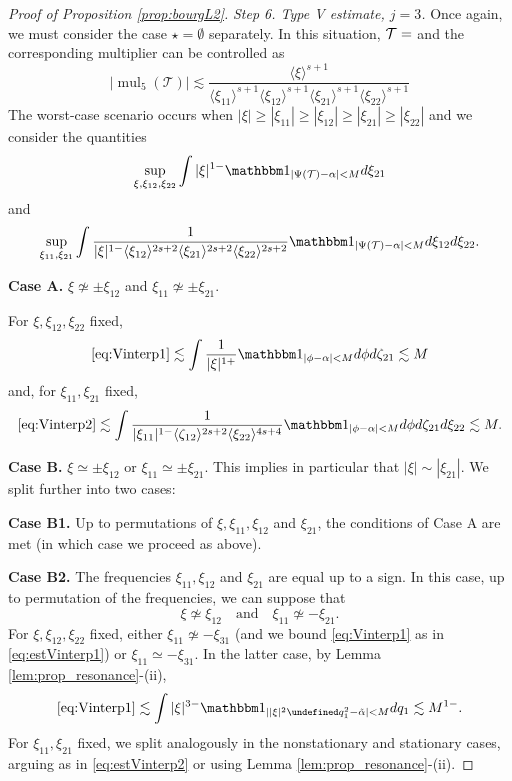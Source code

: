 \documentclass[a4paper,
11pt,  reqno]{amsart}
\makeatletter
\newcommand{\jap}[1]{\langle #1 \rangle}
\newcommand{\5}{\textup{V}}
\newcommand{\noi}{\noindent}
\newcommand{\ind}{\mathbbm 1}
\theoremstyle{remark}
\let\Re=\undefined\DeclareMathOperator*{\Re}{Re}
\newcommand{\TT}{\mathcal{T}}
\DeclareMathOperator{\mul}{mul}
\def\<#1>{\csname MH@symb@#1\endcsname}
\numberwithin{equation}{section}
\numberwithin{theorem}{section}
\makeatother
\begin{document}
\begin{proof}[Proof of Proposition \ref{prop:bourgL2}]
\medskip
\noi\textit{Step 6. Type V estimate, $j=3$.} Once again, we must consider the case $\star=\emptyset$ separately. In this situation, $\TT=\<33>$ and the corresponding multiplier can be controlled as
$$
|\mul_5(\TT)|\lesssim \frac{\jap{\xi}^{s+1}}{\jap{\xi_{11}}^{s+1}\jap{\xi_{12}}^{s+1}\jap{\xi_{21}}^{s+1}\jap{\xi_{22}}^{s+1}}
$$
The worst-case scenario occurs when $|\xi|\ge |\xi_{11}|\ge |\xi_{12}|\ge |\xi_{21}|\ge |\xi_{22}|$ and we consider the quantities
\begin{equation}\label{eq:Vinterp1}
\sup_{\xi, \xi_{12}, \xi_{22}}\int |\xi|^{1-} \ind_{|\Psi(\TT)-\alpha|<M} d\xi_{21}
\end{equation}
and
\begin{equation}\label{eq:Vinterp2}
\sup_{\xi_{11}, \xi_{21}}\int \frac{1}{|\xi|^{1-}\jap{\xi_{12}}^{2s+2}\jap{\xi_{21}}^{2s+2}\jap{\xi_{22}}^{2s+2}}\ind_{|\Psi(\TT)-\alpha|<M} d\xi_{12}d\xi_{22}.
\end{equation}

\smallskip
\noi\textbf{Case A.} $\xi\not\simeq \pm \xi_{12}$ and $\xi_{11}\not\simeq \pm\xi_{21}$.

\noi For $\xi, \xi_{12}, \xi_{22}$ fixed,
\begin{equation}\label{eq:estVinterp1}
\eqref{eq:Vinterp1} \lesssim \int \frac{1}{|\xi|^{1+}} \ind_{|\phi-\alpha|<M} d\phi  d\zeta_{21} \lesssim M 
\end{equation}
and, for $\xi_{11}, \xi_{21}$ fixed,
\begin{equation}\label{eq:estVinterp2}
\eqref{eq:Vinterp2} \lesssim \int \frac{1}{|\xi_{11}|^{1-}\jap{\zeta_{12}}^{2s+2}\jap{\xi_{22}}^{4s+4}} \ind_{|\phi-\alpha|<M}  d\phi d\zeta_{21}d\xi_{22} \lesssim M.
\end{equation}

\smallskip
\noi\textbf{Case B.} $\xi\simeq \pm \xi_{12}$ or $\xi_{11}\simeq \pm\xi_{21}$. This implies in particular that $|\xi|\sim |\xi_{21}|$.
We split further into two cases:

\smallskip
\noi\textbf{Case B1.} Up to permutations of $\xi, \xi_{11}, \xi_{12}$ and $\xi_{21}$, the conditions of Case A are met (in which case we proceed as above).

\smallskip
\noi\textbf{Case B2.} The frequencies $\xi_{11}, \xi_{12}$ and $\xi_{21}$ are equal up to a sign. In this case, up to permutation of the frequencies, we can suppose that
$$
\xi \not\simeq \xi_{12} \quad \mbox{and}\quad \xi_{11}\not\simeq -\xi_{21}.
$$
For $\xi, \xi_{12}, \xi_{22}$ fixed, either $\xi_{11} \not\simeq -\xi_{31}$ (and we bound \eqref{eq:Vinterp1} as in \eqref{eq:estVinterp1}) or $\xi_{11}\simeq -\xi_{31}$. In the latter case, by Lemma \ref{lem:prop_resonance}-(ii),
\begin{equation}
\eqref{eq:Vinterp1} \lesssim \int |\xi|^{3-}\ind_{||\xi|^2\Re q_1^2 - \Tilde{\alpha}|<M} dq_1 \lesssim M^{1-}.
\end{equation}
For $\xi_{11}, \xi_{21}$ fixed, we split analogously in the nonstationary and stationary cases, arguing as in \eqref{eq:estVinterp2} or using Lemma \ref{lem:prop_resonance}-(ii).


\end{proof}
\end{document}

